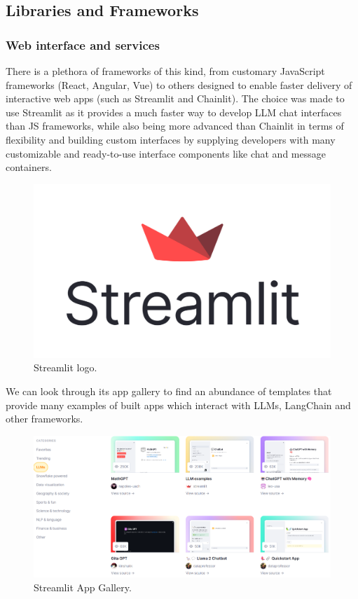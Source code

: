 \subsection{Libraries and Frameworks}

\subsubsection*{Web interface and services}
There is a plethora of frameworks of this kind, from customary JavaScript frameworks (React, Angular, Vue) to others designed to enable faster delivery of interactive web apps (such as Streamlit and Chainlit).\newline
The choice was made to use Streamlit as it provides a much faster way to develop LLM chat interfaces than JS frameworks, while also being more advanced than Chainlit in terms of flexibility and building custom interfaces by supplying developers with many customizable and ready-to-use interface components like chat and message containers.
\begin{figure}[htbp]
    \centering
    \includegraphics[width=.5\linewidth]{./figures/streamlit-logo.png}
    \caption{Streamlit logo.}
\end{figure}\newpage
We can look through its app gallery to find an abundance of templates that provide many examples of built apps which interact with LLMs, LangChain and other frameworks.
\begin{figure}[htbp]
    \centering
    \includegraphics[width=\linewidth]{./figures/streamlit-app-gallery.png}
    \caption{Streamlit App Gallery.}
\end{figure}\newline

